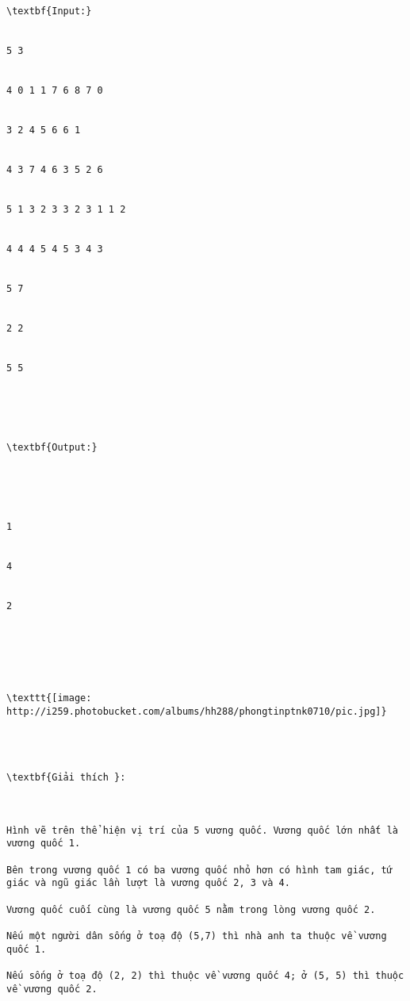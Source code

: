 \begin{verbatim}
\textbf{Input:}


5 3


4 0 1 1 7 6 8 7 0


3 2 4 5 6 6 1


4 3 7 4 6 3 5 2 6


5 1 3 2 3 3 2 3 1 1 2


4 4 4 5 4 5 3 4 3


5 7


2 2


5 5





\textbf{Output:}





1


4


2






\texttt{[image: http://i259.photobucket.com/albums/hh288/phongtinptnk0710/pic.jpg]}




\textbf{Giải thích }: 

 

Hình vẽ trên thể hiện vị trí của 5 vương quốc. Vương quốc lớn nhất là vương quốc 1. 

Bên trong vương quốc 1 có ba vương quốc nhỏ hơn có hình tam giác, tứ giác và ngũ giác lần lượt là vương quốc 2, 3 và 4.

Vương quốc cuối cùng là vương quốc 5 nằm trong lòng vương quốc 2. 

Nếu một người dân sống ở toạ độ (5,7) thì nhà anh ta thuộc về vương quốc 1. 

Nếu sống ở toạ độ (2, 2) thì thuộc về vương quốc 4; ở (5, 5) thì thuộc về vương quốc 2.\end{verbatim}